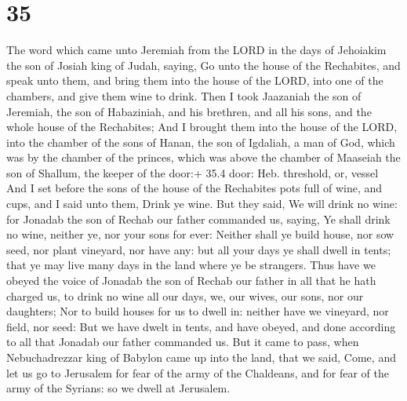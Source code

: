\hypertarget{section-34}{%
\section{35}\label{section-34}}

 The word which came unto Jeremiah from the LORD in the days
of Jehoiakim the son of Josiah king of Judah, saying,  Go
unto the house of the Rechabites, and speak unto them, and bring them
into the house of the LORD, into one of the chambers, and give them wine
to drink.  Then I took Jaazaniah the son of Jeremiah, the
son of Habaziniah, and his brethren, and all his sons, and the whole
house of the Rechabites;  And I brought them into the house
of the LORD, into the chamber of the sons of Hanan, the son of Igdaliah,
a man of God, which was by the chamber of the princes, which was above
the chamber of Maaseiah the son of Shallum, the keeper of the door:+
35.4 door: Heb. threshold, or, vessel  And I set before the
sons of the house of the Rechabites pots full of wine, and cups, and I
said unto them, Drink ye wine.  But they said, We will drink
no wine: for Jonadab the son of Rechab our father commanded us, saying,
Ye shall drink no wine, neither ye, nor your sons for ever: 
Neither shall ye build house, nor sow seed, nor plant vineyard, nor have
any: but all your days ye shall dwell in tents; that ye may live many
days in the land where ye be strangers.  Thus have we obeyed
the voice of Jonadab the son of Rechab our father in all that he hath
charged us, to drink no wine all our days, we, our wives, our sons, nor
our daughters;  Nor to build houses for us to dwell in:
neither have we vineyard, nor field, nor seed:  But we have
dwelt in tents, and have obeyed, and done according to all that Jonadab
our father commanded us.  But it came to pass, when
Nebuchadrezzar king of Babylon came up into the land, that we said,
Come, and let us go to Jerusalem for fear of the army of the Chaldeans,
and for fear of the army of the Syrians: so we dwell at Jerusalem.

